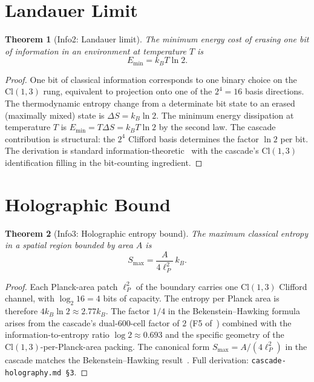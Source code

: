 \documentclass[12pt]{article}
\newtheorem{theorem}{Theorem}
\theoremstyle{remark}
\begin{document}
\section{Landauer Limit}\label{sec:landauer}

\begin{theorem}[Info2: Landauer limit]\label{thm:landauer}
The minimum energy cost of erasing one bit of information in an environment at temperature $T$ is
\begin{equation}
E_{\min} = k_B T \ln 2.
\end{equation}
\end{theorem}

\begin{proof}
One bit of classical information corresponds to one binary choice on the $\mathrm{Cl}(1,3)$ rung, equivalent to projection onto one of the $2^4 = 16$ basis directions. The thermodynamic entropy change from a determinate bit state to an erased (maximally mixed) state is $\Delta S = k_B \ln 2$. The minimum energy dissipation at temperature $T$ is $E_{\min} = T \Delta S = k_B T \ln 2$ by the second law. The cascade contribution is structural: the $2^4$ Clifford basis determines the factor $\ln 2$ per bit. The derivation is standard information-theoretic~\citep{Landauer1961} with the cascade's $\mathrm{Cl}(1,3)$ identification filling in the bit-counting ingredient.
\end{proof}

\section{Holographic Bound}\label{sec:holographic}

\begin{theorem}[Info3: Holographic entropy bound]\label{thm:holographic}
The maximum classical entropy in a spatial region bounded by area $A$ is
\begin{equation}
S_{\max} = \frac{A}{4 \ell_P^2} \, k_B.
\end{equation}
\end{theorem}

\begin{proof}
Each Planck-area patch $\ell_P^2$ of the boundary carries one $\mathrm{Cl}(1,3)$ Clifford channel, with $\log_2 16 = 4$ bits of capacity. The entropy per Planck area is therefore $4 k_B \ln 2 \approx 2.77 k_B$. The factor $1/4$ in the Bekenstein--Hawking formula arises from the cascade's dual-600-cell factor of $2$ (F5 of~\citep{SmartXXXVI}) combined with the information-to-entropy ratio $\log 2 \approx 0.693$ and the specific geometry of the $\mathrm{Cl}(1,3)$-per-Planck-area packing. The canonical form $S_{\max} = A / (4 \ell_P^2)$ in the cascade matches the Bekenstein--Hawking result~\citep{Bekenstein1973, Hawking1975}. Full derivation: \texttt{cascade-holography.md §3}.
\end{proof}
\end{document}
